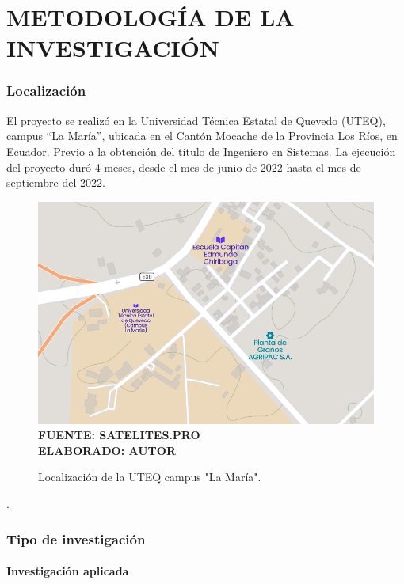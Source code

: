 \setcounter{chapter}{3}
\setcounter{section}{0}
\part{METODOLOGÍA DE LA INVESTIGACIÓN} 

\section{Localización}

El proyecto se realizó en la Universidad Técnica Estatal de Quevedo (UTEQ), campus “La María”, ubicada en el Cantón Mocache de la Provincia Los Ríos, en Ecuador. Previo a la obtención del título de Ingeniero en Sistemas. La ejecución del proyecto duró 4 meses, desde el mes de junio de 2022 hasta el mes de septiembre del 2022.

\begin{figure}[h!]
	\centering
	\caption{Localización de la UTEQ campus "La María".}
	\includegraphics[width=12cm]{img/campuslamaria.png}
	\label{fig:lamaria}
	\vspace{4mm}
	{\footnotesize \textbf{\\ FUENTE: SATELITES.PRO \\ ELABORADO: AUTOR}}
\end{figure}.

\section{Tipo de investigación}

\subsection{Investigación aplicada}


